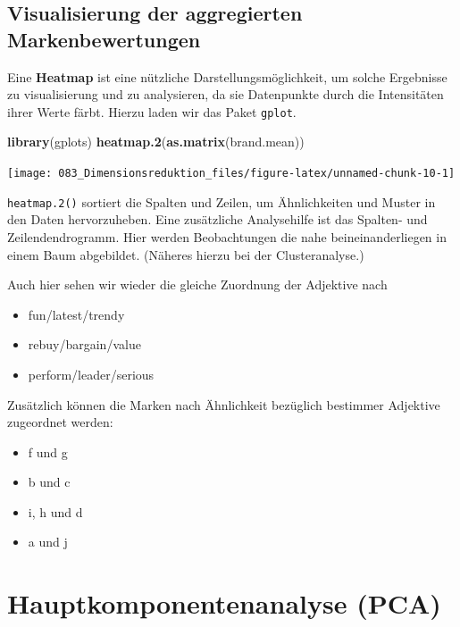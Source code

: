 \documentclass[12pt,]{book}
\makeatletter
\newenvironment{Shaded}{\begin{snugshade}}{\end{snugshade}}
\newcommand{\KeywordTok}[1]{\textcolor[rgb]{0.13,0.29,0.53}{\textbf{{#1}}}}
\newcommand{\NormalTok}[1]{{#1}}
\providecommand{\tightlist}{%
  \setlength{\itemsep}{0pt}\setlength{\parskip}{0pt}}
\newenvironment{kframe}{%
\medskip{}
\setlength{\fboxsep}{.8em}
 \def\at@end@of@kframe{}%
 \ifinner\ifhmode%
  \def\at@end@of@kframe{\end{minipage}}%
  \begin{minipage}{\columnwidth}%
 \fi\fi%
 \def\FrameCommand##1{\hskip\@totalleftmargin \hskip-\fboxsep
 \colorbox{shadecolor}{##1}\hskip-\fboxsep
     \hskip-\linewidth \hskip-\@totalleftmargin \hskip\columnwidth}%
 \MakeFramed {\advance\hsize-\width
   \@totalleftmargin\z@ \linewidth\hsize
   \@setminipage}}%
 {\par\unskip\endMakeFramed%
 \at@end@of@kframe}
\renewenvironment{Shaded}{\begin{kframe}}{\end{kframe}}
\makeatother
\begin{document}
\subsection{Visualisierung der aggregierten
Markenbewertungen}\label{visualisierung-der-aggregierten-markenbewertungen}

Eine \textbf{Heatmap} ist eine nützliche Darstellungsmöglichkeit, um
solche Ergebnisse zu visualisierung und zu analysieren, da sie
Datenpunkte durch die Intensitäten ihrer Werte färbt. Hierzu laden wir
das Paket \texttt{gplot}.

\begin{Shaded}
\begin{Highlighting}[]
\KeywordTok{library}\NormalTok{(gplots)}
\KeywordTok{heatmap.2}\NormalTok{(}\KeywordTok{as.matrix}\NormalTok{(brand.mean))}
\end{Highlighting}
\end{Shaded}

\begin{center}\texttt{[image: 083\_Dimensionsreduktion\_files/figure-latex/unnamed-chunk-10-1]} \end{center}

\texttt{heatmap.2()} sortiert die Spalten und Zeilen, um Ähnlichkeiten
und Muster in den Daten hervorzuheben. Eine zusätzliche Analysehilfe ist
das Spalten- und Zeilendendrogramm. Hier werden Beobachtungen die nahe
beineinanderliegen in einem Baum abgebildet. (Näheres hierzu bei der
Clusteranalyse.)

Auch hier sehen wir wieder die gleiche Zuordnung der Adjektive nach

\begin{itemize}
\tightlist
\item
  fun/latest/trendy
\item
  rebuy/bargain/value
\item
  perform/leader/serious
\end{itemize}

Zusätzlich können die Marken nach Ähnlichkeit bezüglich bestimmer
Adjektive zugeordnet werden:

\begin{itemize}
\tightlist
\item
  f und g
\item
  b und c
\item
  i, h und d
\item
  a und j
\end{itemize}

\section{Hauptkomponentenanalyse
(PCA)}\label{hauptkomponentenanalyse-pca}
\end{document}
